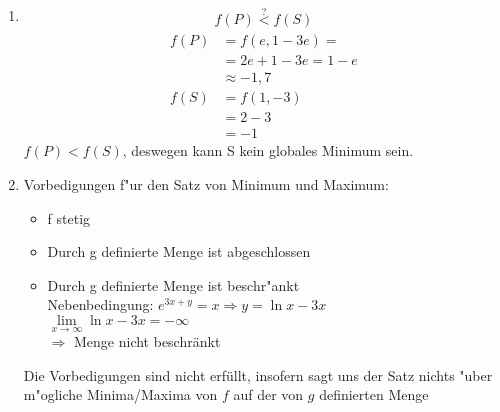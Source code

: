 \documentclass[fleqn,12pt]{scrartcl}
\begin{document}
\begin{enumerate}
		\item
			\begin{align*}
				f(P) \overset?< f(S)
			\end{align*}
			\begin{align*}
				f(P) &= f(e, 1 - 3e) = \\
							&= 2e + 1 -3e 
				= 1 - e\\
				&\approx -1,7\\
				f(S) &= f(1, -3) \\
							&= 2 -3 \\
					 &= -1
			\end{align*}
			$f(P) < f(S)$, deswegen kann S kein globales Minimum sein.
		\item
			Vorbedigungen f"ur den Satz von Minimum und Maximum:
			\begin{itemize}
				\item f stetig \checkmark
				\item Durch g definierte Menge ist abgeschlossen \checkmark
				\item Durch g definierte Menge ist beschr"ankt \\
					Nebenbedingung: $e^{3x+y} = x \Rightarrow y = \ln x - 3x$
					\\ 
					$\lim\limits_{x \to \infty} \ln x - 3x = - \infty$\\
					$\Rightarrow$ Menge nicht beschränkt
			\end{itemize}
			Die Vorbedigungen sind nicht erfüllt, insofern sagt uns der Satz nichts "uber m"ogliche Minima/Maxima von $f$ auf der von $g$ definierten Menge
	\end{enumerate}
\end{document}
